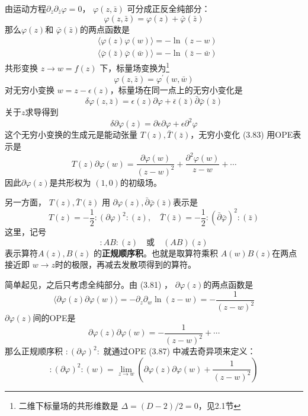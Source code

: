 由运动方程$ \partial_{z} \partial_{\bar{z}} \varphi=0 $， $\varphi(z,\bar{z})$ 可分成正反全纯部分：
\begin{equation}
	\varphi(z, \bar{z})=\varphi(z)+\bar{\varphi}(\bar{z})
\end{equation}
那么$ \varphi(z) $和 $\bar{\varphi}(\bar{z}) $的两点函数是
\begin{align} &\langle\varphi(z) \varphi(w)\rangle=-\ln (z-w) \\ &\langle\bar{\varphi}(\bar{z}) \bar{\varphi}(\bar{w})\rangle=-\ln (\bar{z}-\bar{w}) \end{align}
共形变换 $z\to w=f(z)$ 下，标量场变换为\footnote{二维下标量场的共形维数是 $\Delta=(D-2)/2=0 $，见2.1节}
\[\varphi(z, \bar{z})=\varphi^{\prime}(w, \bar{w})
\]
对无穷小变换 $w=z-\epsilon(z) $，标量场在同一点上的无穷小变化是
$$
\delta \varphi(z, \bar{z})=\epsilon(z) \partial \varphi+\bar{\epsilon}(\bar{z}) \bar{\partial} \bar{\varphi}(\bar{z})
$$
关于$ z $求导得到
\begin{equation}
	\delta \partial \varphi(z)=\partial \epsilon \partial \varphi+\epsilon \partial^{2} \varphi
\end{equation}
这个无穷小变换的生成元是能动张量 $T(z),\bar{T}(\bar{z}) $，无穷小变化 (3.83) 用OPE表示是
\begin{equation}
	T(z) \partial \varphi(w)=\frac{\partial \varphi(w)}{(z-w)^{2}}+\frac{\partial^{2} \varphi(w)}{z-w}+\cdots
\end{equation}
因此$ \partial \varphi(z) $是共形权为 $(1,0) $的初级场。

另一方面， $T(z),\bar{T}(\bar{z})$ 用 $\partial \varphi(z),\bar{\partial}\bar{\varphi}(\bar{z}) $表示是
\begin{equation}
	T(z)=-\frac{1}{2}:(\partial \varphi)^{2}:(z), \quad \bar{T}(\bar{z})=-\frac{1}{2}:(\bar{\partial} \bar{\varphi})^{2}:(\bar{z})
\end{equation}
这里，记号
$$
:AB:(z)\quad\text{或}\quad(AB)(z)
$$
表示算符$ A(z),B(z)$ 的\textbf{正规顺序积}。也就是取算符乘积 $A(w)B(z) $在两点接近即 $w\to z $时的极限，再减去发散项得到的算符。

简单起见，之后只考虑全纯部分。由 (3.81) ， $\partial \varphi(z) $的两点函数是
\begin{equation}
	\langle\partial \varphi(z) \partial \varphi(w)\rangle=-\partial_{z} \partial_{w} \ln (z-w)=-\frac{1}{(z-w)^{2}}
\end{equation}
$\partial \varphi(z) $间的OPE是
\begin{equation}
	\partial \varphi(z) \partial \varphi(w)=-\frac{1}{(z-w)^{2}}+\cdots
\end{equation}
那么正规顺序积 $:(\partial \varphi)^2:$ 就通过OPE (3.87) 中减去奇异项来定义：
\begin{equation}
:(\partial \varphi)^{2}:(w)=\lim _{z \rightarrow w}\left(\partial \varphi(z) \partial \varphi(w)+\frac{1}{(z-w)^{2}}\right)
\end{equation}

